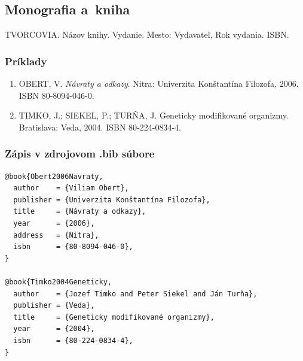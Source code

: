 \documentclass[../../../thesis.tex]{subfiles}
\begin{document}
\subsection{Monografia a~kniha}
\begin{trivlist}
\item TVORCOVIA. Názov knihy. Vydanie. Mesto: Vydavateľ, Rok vydania. ISBN.
\end{trivlist}

\subsubsection*{\normalsize Príklady}
\begin{enumerate}
\item OBERT, V. \textit{Návraty a odkazy}. Nitra: Univerzita Konštantína Filozofa, 2006. ISBN 80-8094-046-0.

\item TIMKO, J.; SIEKEL, P.; TURŇA, J. Geneticky modifikované organizmy. Bratislava: Veda, 2004. ISBN 80-224-0834-4.
\end{enumerate}

\subsubsection*{\normalsize Zápis v zdrojovom .bib súbore}
\begin{verbatim}
@book{Obert2006Navraty,
  author    = {Viliam Obert},
  publisher = {Univerzita Konštantína Filozofa},
  title     = {Návraty a odkazy},
  year      = {2006},
  address   = {Nitra},
  isbn      = {80-8094-046-0},
}

@book{Timko2004Geneticky,
  author    = {Jozef Timko and Peter Siekel and Ján Turňa},
  publisher = {Veda},
  title     = {Geneticky modifikované organizmy},
  year      = {2004},
  isbn      = {80-224-0834-4},
}
\end{verbatim}
\end{document}

